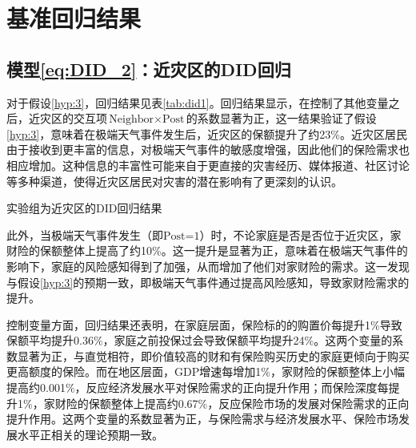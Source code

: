 %     

\section{基准回归结果}

%     

\subsection{模型\ref{eq:DID_2}：近灾区的DID回归}
对于假设\ref{hyp:3}，回归结果见表\ref{tab:did1}。回归结果显示，在控制了其他变量之后，近灾区的交互项$\text{Neighbor}\times \text{Post}$的系数显著为正，这一结果验证了假设\ref{hyp:3}，意味着在极端天气事件发生后，近灾区的保额提升了约23\%。近灾区居民由于接收到更丰富的信息，对极端天气事件的敏感度增强，因此他们的保险需求也相应增加。这种信息的丰富性可能来自于更直接的灾害经历、媒体报道、社区讨论等多种渠道，使得近灾区居民对灾害的潜在影响有了更深刻的认识。
\begin{table}[H]
    \centering
    \caption{实验组为近灾区的DID回归结果}\label{tab:did1}
    
\end{table}

此外，当极端天气事件发生（即$\text{Post=1}$）时，不论家庭是否是否位于近灾区，家财险的保额整体上提高了约10\%。这一提升是显著为正，意味着在极端天气事件的影响下，家庭的风险感知得到了加强，从而增加了他们对家财险的需求。这一发现与假设\ref{hyp:3}的预期一致，即极端天气事件通过提高风险感知，导致家财险需求的提升。

控制变量方面，回归结果还表明，在家庭层面，保险标的的购置价每提升1\%导致保额平均提升0.36\%，家庭之前投保过会导致保额平均提升24\%。这两个变量的系数显著为正，与直觉相符，即价值较高的财和有保险购买历史的家庭更倾向于购买更高额度的保险。而在地区层面，GDP增速每增加1\%，家财险的保额整体上小幅提高约0.001\%，反应经济发展水平对保险需求的正向提升作用\citep{JJYJ200401002,arena2008does}；而保险深度每提升1\%，家财险的保额整体上提高约0.67\%，反应保险市场的发展对保险需求的正向提升作用\citep{JRYJ200706018}。这两个变量的系数显著为正，与保险需求与经济发展水平、保险市场发展水平正相关的理论预期一致。

